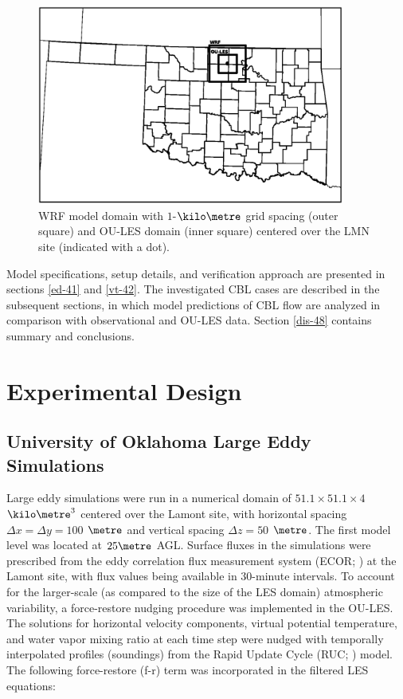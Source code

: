 \begin{figure}[H]
\begin{center}
\includegraphics[width=0.9\textwidth]{figures/chapter4/domains}
\end{center}
\caption{WRF model domain with $1$-$\kilo\metre$ grid spacing (outer square) and OU-LES domain (inner square) centered over the LMN site (indicated with a dot).}
\label{figure01}
\end{figure}


Model specifications, setup details, and verification approach are presented in sections \autoref{ed-41} and \autoref{vt-42}. The investigated CBL cases are described in the subsequent sections, in which model predictions of CBL flow are analyzed in comparison with observational and OU-LES data. Section \autoref{dis-48} contains summary and conclusions.

\section{Experimental Design}
\label{ed-41}

\subsection{University of Oklahoma Large Eddy Simulations}
\label{les-411}

Large eddy simulations were run in a numerical domain of $51.1 \times 51.1 \times 4$ $\kilo\metre^3$ centered over the Lamont site, with horizontal spacing $\Delta x = \Delta y = 100$ $\metre$ and vertical spacing $\Delta z = 50$ $\metre$. The first model level was located at $25 \mbox {} \metre$ AGL. Surface fluxes in the simulations were prescribed from the eddy correlation flux measurement system (ECOR; \citealt{armECOR}) at the Lamont site, with flux values being available in 30-minute intervals. To account for the larger-scale (as compared to the size of the LES domain) atmospheric variability, a force-restore nudging procedure was implemented in the OU-LES. The solutions for horizontal velocity components, virtual potential temperature, and water vapor mixing ratio at each time step were nudged with temporally interpolated profiles (soundings) from the Rapid Update Cycle (RUC; \citealt{RUC}) model. The following force-restore (f-r) term was incorporated in the filtered LES equations:


